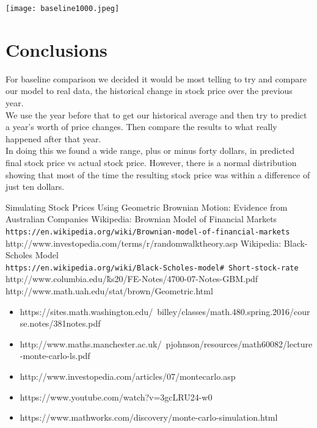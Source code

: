 \documentclass{article}
\begin{document}
\texttt{[image: baseline1000.jpeg]}


\section{Conclusions}

For baseline comparison we decided it would be most telling to try and compare our model to real data, the historical change in stock price over the previous year.\\
We use the year before that to get our historical average and then try to predict a year's worth of price changes. Then compare the results to what really happened after that year.\\
In doing this we found a wide range, plus or minus forty dollars, in predicted final stock price vs actual stock price. However, there is a normal distribution showing that most of the time the resulting stock price was within a difference of just ten dollars.


\pagebreak
\begin{thebibliography}{9}
Simulating Stock Prices Using Geometric Brownian Motion: Evidence from Australian
Companies
Wikipedia: Brownian Model of Financial Markets\\
\texttt{https://en.wikipedia.org/wiki/Brownian-model-of-financial-markets}
http://www.investopedia.com/terms/r/randomwalktheory.asp
Wikipedia: Black-Scholes Model\\
\texttt{https://en.wikipedia.org/wiki/Black-Scholes-model\# Short-stock-rate}
http://www.columbia.edu/\~ ks20/FE-Notes/4700-07-Notes-GBM.pdf
http://www.math.uah.edu/stat/brown/Geometric.html
\end{thebibliography}


\begin{itemize}
	\item https://sites.math.washington.edu/~billey/classes/math.480.spring.2016/course.notes/381notes.pdf
    \item http://www.maths.manchester.ac.uk/~pjohnson/resources/math60082/lecture-monte-carlo-ls.pdf
	\item http://www.investopedia.com/articles/07/montecarlo.asp
	\item https://www.youtube.com/watch?v=3gcLRU24-w0
	\item https://www.mathworks.com/discovery/monte-carlo-simulation.html
    
\end{itemize}

	
	
	
\end{document}

